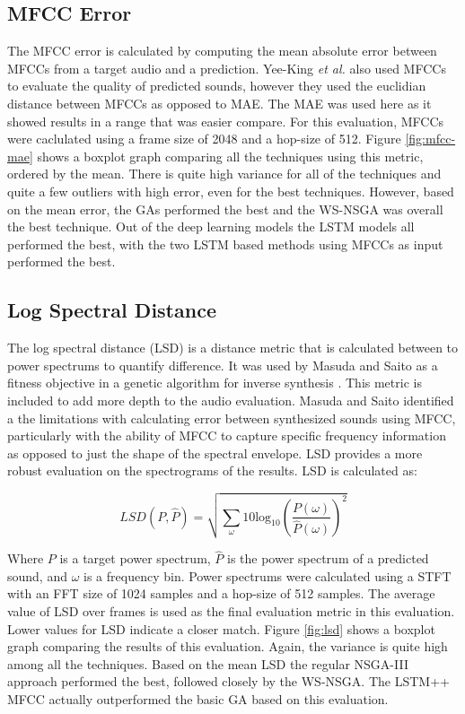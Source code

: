 \subsection{MFCC Error}
The MFCC error is calculated by computing the mean absolute error between MFCCs from a target audio and a prediction. Yee-King \textit{et al.} \cite{yee2018automatic} also used MFCCs to evaluate the quality of predicted sounds, however they used the euclidian distance between MFCCs as opposed to MAE. The MAE was used here as it showed results in a range that was easier compare. For this evaluation, MFCCs were caclulated using a frame size of 2048 and a hop-size of 512. Figure \ref{fig:mfcc-mae} shows a boxplot graph comparing all the techniques using this metric, ordered by the mean. There is quite high variance for all of the techniques and quite a few outliers with high error, even for the best techniques. However, based on the mean error, the GAs performed the best and the WS-NSGA was overall the best technique. Out of the deep learning models the LSTM models all performed the best, with the two LSTM based methods using MFCCs as input performed the best.

\subsection{Log Spectral Distance}
The log spectral distance (LSD) is a distance metric that is calculated between to power spectrums to quantify difference. It was used by Masuda and Saito as a fitness objective in a genetic algorithm for inverse synthesis \cite{masudo2021quality}. This metric is included to add more depth to the audio evaluation. Masuda and Saito identified a the limitations with calculating error between synthesized sounds using MFCC, particularly with the ability of MFCC to capture specific frequency information as opposed to just the shape of the spectral envelope. LSD provides a more robust evaluation on the spectrograms of the results.  LSD is calculated as:

\begin{equation}
    LSD(P, \hat{P}) = \sqrt{\sum_{\omega}10\text{log}_{10}\left( \frac{P(\omega)}{\hat{P}(\omega)} \right)^2}
\end{equation}

Where $P$ is a target power spectrum, $\hat{P}$ is the power spectrum of a predicted sound, and $\omega$ is a frequency bin. Power spectrums were calculated using a STFT with an FFT size of 1024 samples and a hop-size of 512 samples. The average value of LSD over frames is used as the final evaluation metric in this evaluation. Lower values for LSD indicate a closer match. Figure \ref{fig:lsd} shows a boxplot graph comparing the results of this evaluation. Again, the variance is quite high among all the techniques. Based on the mean LSD the regular NSGA-III approach performed the best, followed closely by the WS-NSGA. The LSTM++ MFCC actually outperformed the basic GA based on this evaluation.

